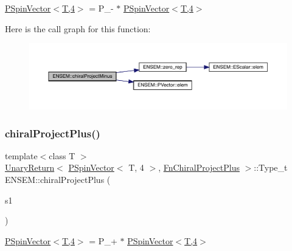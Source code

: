 \mbox{\hyperlink{classENSEM_1_1PSpinVector_3_01T_00_014_01_4}{P\+Spin\+Vector$<$\+T,4$>$}} = P\+\_\+-\/ $\ast$ \mbox{\hyperlink{classENSEM_1_1PSpinVector_3_01T_00_014_01_4}{P\+Spin\+Vector$<$\+T,4$>$}} 

Here is the call graph for this function\+:\nopagebreak
\begin{figure}[H]
\begin{center}
\leavevmode
\includegraphics[width=350pt]{dd/d6d/group__primspinvector_ga7af53ea534552edc873a7cb1f52a94e1_cgraph}
\end{center}
\end{figure}
\mbox{\label{group__primspinvector_ga2d58ba66261a878c90b4c5dbc1af1863}} 
\subsubsection{\texorpdfstring{chiralProjectPlus()}{chiralProjectPlus()}}
{\footnotesize\ttfamily template$<$class T $>$ \\
\mbox{\hyperlink{structENSEM_1_1UnaryReturn}{Unary\+Return}}$<$ \mbox{\hyperlink{classENSEM_1_1PSpinVector}{P\+Spin\+Vector}}$<$ T, 4 $>$, \mbox{\hyperlink{structENSEM_1_1FnChiralProjectPlus}{Fn\+Chiral\+Project\+Plus}} $>$\+::Type\+\_\+t E\+N\+S\+E\+M\+::chiral\+Project\+Plus (\begin{DoxyParamCaption}\item[{const \mbox{\hyperlink{classENSEM_1_1PSpinVector}{P\+Spin\+Vector}}$<$ T, 4 $>$ \&}]{s1 }\end{DoxyParamCaption})\hspace{0.3cm}{\ttfamily [inline]}}



\mbox{\hyperlink{classENSEM_1_1PSpinVector_3_01T_00_014_01_4}{P\+Spin\+Vector$<$\+T,4$>$}} = P\+\_\++ $\ast$ \mbox{\hyperlink{classENSEM_1_1PSpinVector_3_01T_00_014_01_4}{P\+Spin\+Vector$<$\+T,4$>$}} 

